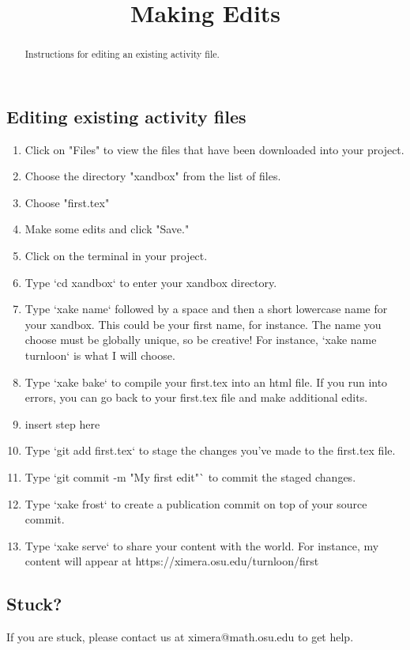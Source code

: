 \documentclass{ximera}
\title{Making Edits}
\begin{document}
\begin{abstract}
Instructions for editing an existing activity file.
\end{abstract}
\maketitle


\subsection{Editing existing activity files}
\begin{enumerate}

\item Click on "Files" to view the files that have been downloaded into your project.
\item Choose the directory "xandbox" from the list of files.
\item Choose "first.tex"
\item Make some edits and click "Save."
\item Click on the terminal in your project.
\item Type `cd xandbox` to enter your xandbox directory.
\item Type `xake name` followed by a space and then a short lowercase name for your xandbox.  This could be your first name, for instance.  The name you choose must be globally unique, so be creative!  For instance, `xake name turnloon` is what I will choose.
\item Type `xake bake` to compile your first.tex into an html file.  If you run into errors, you can go back to your first.tex file and make additional edits.
\item insert step here
\item Type `git add first.tex` to stage the changes you've made to the first.tex file.
\item Type `git commit -m "My first edit"` to commit the staged changes.
\item Type `xake frost` to create a publication commit on top of your source commit.
\item Type `xake serve` to share your content with the world.  For instance, my content will appear at https://ximera.osu.edu/turnloon/first
\end{enumerate}
\subsection{Stuck?}

If you are stuck, please contact us at ximera@math.osu.edu to get help.
\end{document}
